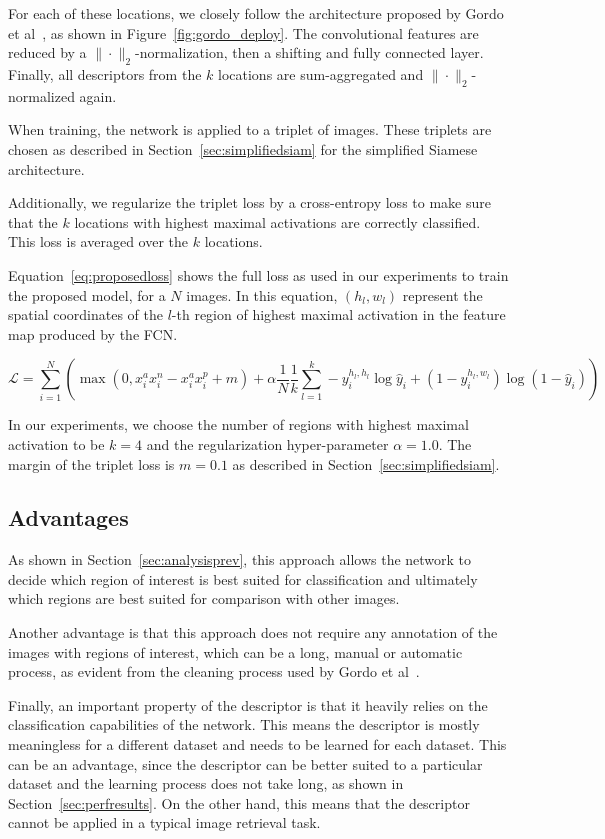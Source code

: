 For each of these locations, we closely follow the architecture
proposed by Gordo et al~\cite{gordo_deep_2016}, as shown in
Figure~\ref{fig:gordo_deploy}. The convolutional features are
reduced by a $\|\cdot\|_2$-normalization, then a shifting and fully connected
layer. Finally, all descriptors from the $k$ locations are
sum-aggregated and $\|\cdot\|_2$-normalized again.

When training, the network is applied to a triplet of images.
These triplets are chosen as described in Section~\ref{sec:simplifiedsiam}
for the simplified Siamese architecture.

Additionally, we regularize the triplet loss by a cross-entropy loss
to make sure that the $k$ locations with highest
maximal activations are correctly classified. This loss is averaged over
the $k$ locations.

Equation~\ref{eq:proposedloss} shows the full loss as used in our
experiments to train the proposed model, for a $N$ images. In this
equation, $(h_l, w_l)$ represent the spatial coordinates of the $l$-th
region of highest maximal activation in the feature map produced by
the FCN.

\begin{equation}\label{eq:proposedloss}
\mathcal{L} = \sum_{i=1}^N \left( \max(0, x^a_i x^n_i - x^a_i x^p_i + m) +
\alpha \frac{1}{N} \frac{1}{k} \sum_{l=1}^k -
y_i^{h_l,h_l} \log \hat{y}_i + (1-y_i^{h_l,w_l}) \log (1-\hat{y}_i) \right)
\end{equation}

In our experiments, we choose the number of regions with highest maximal
activation to be $k=4$ and the regularization hyper-parameter $\alpha=1.0$.
The margin of the triplet loss is $m=0.1$ as described in
Section~\ref{sec:simplifiedsiam}.

\subsection{Advantages}
As shown in Section~\ref{sec:analysisprev}, this approach
allows the network to decide which region of interest is
best suited for classification and ultimately which regions
are best suited for comparison with other images.

Another advantage is that this approach does not require
any annotation of the images with regions of interest,
which can be a long, manual or automatic process, as evident
from the cleaning process used by Gordo et al~\cite{gordo_end--end_2016}.

Finally, an important property of the descriptor is that it
heavily relies on the classification
capabilities of the network. This means the descriptor is
mostly meaningless for a different dataset and needs
to be learned for each dataset. This can be an advantage,
since the descriptor can be better suited to a particular
dataset and the learning process does not take long, as shown
in Section~\ref{sec:perfresults}. On the other hand, this means that
the descriptor cannot be applied in a typical image retrieval
task.
